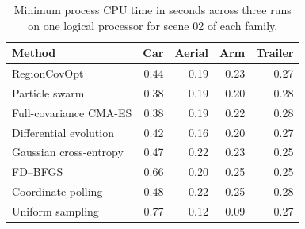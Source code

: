 \begin{table}[htbp]\centering\small\caption{Minimum process CPU time in seconds across three runs on one logical processor for scene 02 of each family.}\begin{tabular}{lrrrr}\toprule
Method & Car & Aerial & Arm & Trailer\\\midrule
RegionCovOpt & 0.44 & 0.19 & 0.23 & 0.27\\
Particle swarm & 0.38 & 0.19 & 0.20 & 0.28\\
Full-covariance CMA-ES & 0.38 & 0.19 & 0.22 & 0.28\\
Differential evolution & 0.42 & 0.16 & 0.20 & 0.27\\
Gaussian cross-entropy & 0.47 & 0.22 & 0.23 & 0.25\\
FD--BFGS & 0.66 & 0.20 & 0.25 & 0.25\\
Coordinate polling & 0.48 & 0.22 & 0.25 & 0.28\\
Uniform sampling & 0.77 & 0.12 & 0.09 & 0.27\\
\bottomrule\end{tabular}\end{table}
